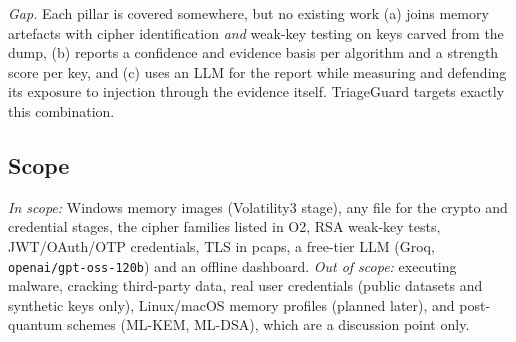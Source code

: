 \textit{Gap.} Each pillar is covered somewhere, but no existing work (a) joins memory artefacts with cipher
identification \emph{and} weak-key testing on keys carved from the dump, (b) reports a confidence and evidence
basis per algorithm and a strength score per key, and (c) uses an LLM for the report while measuring and
defending its exposure to injection through the evidence itself. TriageGuard targets exactly this combination.

\subsection{Scope}
\textit{In scope:} Windows memory images (Volatility3 stage), any file for the crypto and credential stages,
the cipher families listed in O2, RSA weak-key tests, JWT/OAuth/OTP credentials, TLS in pcaps, a free-tier
LLM (Groq, \texttt{openai/gpt-oss-120b}) and an offline dashboard.
\textit{Out of scope:} executing malware, cracking third-party data, real user credentials (public datasets
and synthetic keys only), Linux/macOS memory profiles (planned later), and post-quantum schemes (ML-KEM,
ML-DSA), which are a discussion point only.

